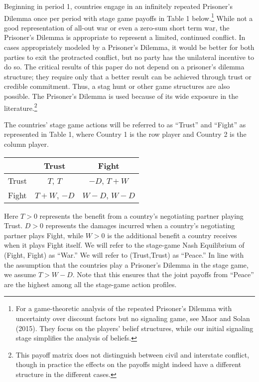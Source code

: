 \documentclass[12pt, letterpaper]{article}
\begin{document}
Beginning in period 1, countries engage in an infinitely repeated Prisoner's Dilemma once per period with stage game payoffs in Table 1 below.\footnote{For a game-theoretic analysis of the repeated Prisoner's Dilemma with uncertainty over discount factors but no signaling game, see Maor and Solan (2015). They focus on the players' belief structures, while our initial signaling stage simplifies the analysis of beliefs.} While not a good representation of all-out war or even a zero-sum short term war, the Prisoner's Dilemma is appropriate to represent a limited, continued conflict. In cases appropriately modeled by a Prisoner's Dilemma, it would be better for both parties to exit the protracted conflict, but no party has the unilateral incentive to do so. The critical results of this paper do not depend on a prisoner's dilemma structure; they require only that a better result can be achieved through trust or credible commitment. Thus, a stag hunt or other game structures are also possible. The Prisoner's Dilemma is used because of its wide exposure in the literature.\footnote{This payoff matrix does not distinguish between civil and interstate conflict, though in practice the effects on the payoffs might indeed have a different structure in the different cases.} 

The countries' stage game actions will be referred to as ``Trust'' and ``Fight'' as represented in Table 1, where Country 1 is the row player and Country 2 is the column player.

\begin{center}
\begin{tabular}{|l|c|c|}
  \hline      & Trust & Fight \\ \hline
	 Trust& $T$, $T$& $-D$, $T+W$ \\ \hline
	Fight & $T+W$, $-D$& $W-D$, $W-D$ \\ \hline
\end{tabular}
\end{center}

Here $T>0$ represents the benefit from a country's negotiating partner playing Trust. $D>0$ represents the damages incurred when a country's negotiating partner plays Fight, while $W>0$ is the additional benefit a country receives when it plays Fight itself. We will refer to the stage-game Nash Equilibrium of (Fight, Fight) as ``War.'' We will refer to (Trust,Trust) as ``Peace.'' In line with the assumption that the countries play a Prisoner's Dilemma in the stage game, we assume $T>W-D$. Note that this ensures that the joint payoffs from ``Peace'' are the highest among all the stage-game action profiles. 
\end{document}
